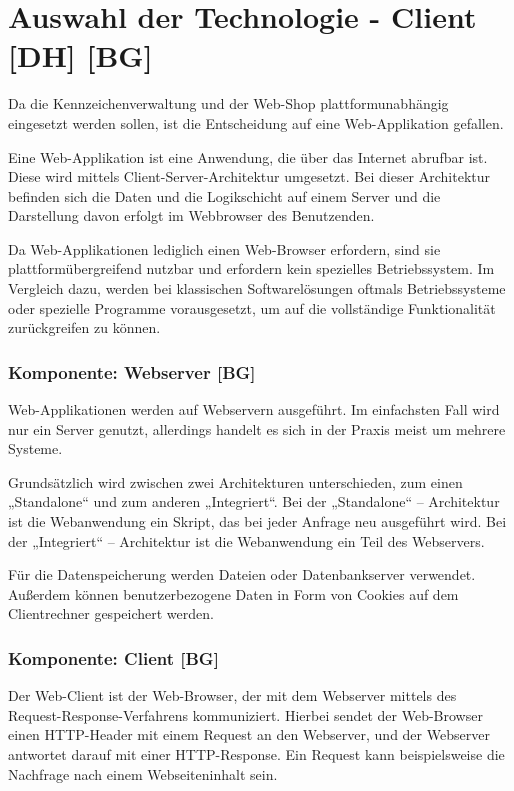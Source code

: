 \section{Auswahl der Technologie - Client [DH] [BG]}

Da die Kennzeichenverwaltung und der Web-Shop plattformunabhängig eingesetzt werden sollen, ist die Entscheidung auf eine Web-Applikation gefallen.

Eine Web-Applikation ist eine Anwendung, die über das Internet abrufbar ist. Diese wird mittels Client-Server-Architektur umgesetzt. Bei dieser Architektur befinden sich die Daten und die Logikschicht auf einem Server und die Darstellung davon erfolgt im Webbrowser des Benutzenden.

Da Web-Applikationen lediglich einen Web-Browser erfordern, sind sie plattformübergreifend nutzbar und erfordern kein spezielles Betriebssystem.
Im Vergleich dazu, werden bei klassischen Softwarelösungen oftmals Betriebssysteme oder spezielle Programme vorausgesetzt, um auf die vollständige Funktionalität zurückgreifen zu können.

\subsubsection{Komponente: Webserver [BG]}
Web-Applikationen werden auf Webservern ausgeführt. Im einfachsten Fall wird nur ein Server genutzt, allerdings handelt es sich in der Praxis meist um mehrere Systeme. 

Grundsätzlich wird zwischen zwei Architekturen unterschieden, zum einen „Standalone“ und zum anderen „Integriert“. Bei der „Standalone“ – Architektur ist die Webanwendung ein Skript, das bei jeder Anfrage neu ausgeführt wird. Bei der „Integriert“ – Architektur ist die Webanwendung ein Teil des Webservers.

Für die Datenspeicherung werden Dateien oder Datenbankserver verwendet. Außerdem können benutzerbezogene Daten in Form von Cookies auf dem Clientrechner gespeichert werden.

\subsubsection{Komponente: Client [BG]}

Der Web-Client ist der Web-Browser, der mit dem Webserver mittels des Request-Response-Verfahrens kommuniziert. Hierbei sendet der Web-Browser einen HTTP-Header mit einem Request an den Webserver, und der Webserver antwortet darauf mit einer HTTP-Response. Ein Request kann beispielsweise die Nachfrage nach einem Webseiteninhalt sein. 

